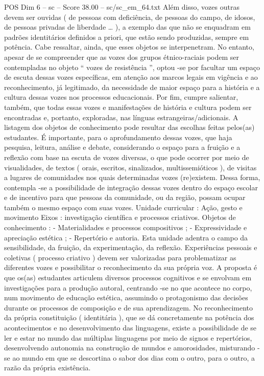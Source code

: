 \begin{textsample}{POS Dim 6 – sc – Score 38.00 – sc/sc\_em\_64.txt}
Além disso, vozes outras devem ser ouvidas ( de pessoas com deficiência, de pessoas do campo, de idosos, de pessoas privadas de liberdade … ), a exemplo das que não se enquadram em padrões identitários definidos a priori, que estão sendo produzidas, sempre em potência.
Cabe ressaltar, ainda, que esses objetos se interpenetram.
No entanto, apesar de se compreender que as vozes dos grupos étnico-raciais podem ser contempladas no objeto “ vozes de resistência ”, optou -se por facultar um espaço de escuta dessas vozes específicas, em atenção aos marcos legais em vigência e ao reconhecimento, já legitimado, da necessidade de maior espaço para a história e a cultura dessas vozes nos processos educacionais.
Por fim, cumpre salientar, também, que todas essas vozes e manifestações de história e cultura podem ser encontradas e, portanto, exploradas, nas línguas estrangeiras/adicionais.
A listagem dos objetos de conhecimento pode resultar das escolhas feitas pelos(as) estudantes.
É importante, para o aprofundamento dessas vozes, que haja pesquisa, leitura, análise e debate, considerando o espaço para a fruição e a reflexão com base na escuta de vozes diversas, o que pode ocorrer por meio de visualidades, de textos ( orais, escritos, sinalizados, multissemióticos ), de visitas a lugares de comunidades nos quais determinadas vozes (re)existem.
Dessa forma, contempla -se a possibilidade de integração dessas vozes dentro do espaço escolar e de incentivo para que pessoas da comunidade, ou da região, possam ocupar também o mesmo espaço com suas vozes.
Unidade curricular : Ação, gesto e movimento Eixos : investigação científica e processos criativos.
Objetos de conhecimento : - Materialidades e processos compositivos ; - Expressividade e apreciação estética ; - Repertório e autoria.
Esta unidade adentra o campo da sensibilidade, da fruição, da experimentação, da reflexão.
Experiências pessoais e coletivas ( processo criativo ) devem ser valorizadas para problematizar as diferentes vozes e possibilitar o reconhecimento da sua própria voz.
A proposta é que os(as) estudantes articulem diversos processos cognitivos e se envolvam em investigações para a produção autoral, centrando -se no que acontece no corpo, num movimento de educação estética, assumindo o protagonismo das decisões durante os processos de composição e de sua aprendizagem.
No reconhecimento da própria constituição ( identitária ), que se dá concretamente na potência dos acontecimentos e no desenvolvimento das linguagens, existe a possibilidade de se ler e estar no mundo das múltiplas linguagens por meio de signos e repertórios, desenvolvendo autonomia na construção de mundos e amorosidades, misturando -se ao mundo em que se descortina o sabor dos dias com o outro, para o outro, a razão da própria existência.

\end{textsample}
